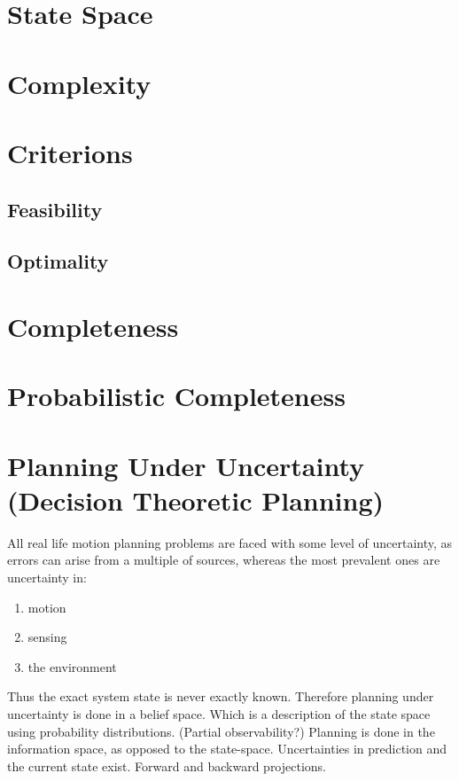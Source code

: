 \section{State Space}

\section{Complexity}

\section{Criterions}

\subsection{Feasibility}
\subsection{Optimality}

\section{Completeness}

\section{Probabilistic Completeness}

\section{Planning Under Uncertainty (Decision Theoretic Planning)}

All real life motion planning problems are faced with some level of uncertainty,
as errors can arise from a multiple of sources, whereas the most prevalent ones
are uncertainty in:
\begin{enumerate}
\item motion
\item sensing
\item the environment
\end{enumerate}
Thus the exact system state is never exactly known. Therefore planning under
uncertainty is done in a belief space. Which is a description of the state space
using probability distributions. (Partial observability?)
Planning is done in the information space, as opposed to the state-space.
Uncertainties in prediction and the current state exist.
Forward and backward projections.

